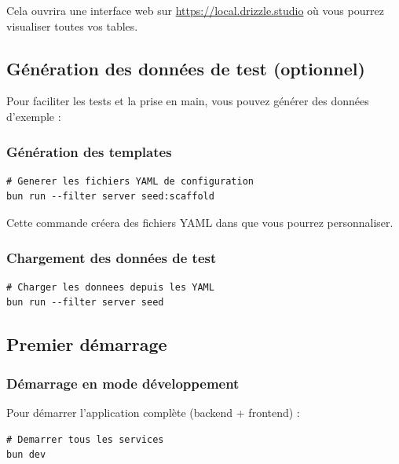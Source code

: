 Cela ouvrira une interface web sur \url{https://local.drizzle.studio} où vous pourrez visualiser toutes vos tables.

\subsection{Génération des données de test (optionnel)}

Pour faciliter les tests et la prise en main, vous pouvez générer des données d'exemple :

\subsubsection{Génération des templates}

\begin{lstlisting}[language={}, frame=single]
# Generer les fichiers YAML de configuration
bun run --filter server seed:scaffold
\end{lstlisting}

Cette commande créera des fichiers YAML dans  que vous pourrez personnaliser.

\subsubsection{Chargement des données de test}

\begin{lstlisting}[language={}, frame=single]
# Charger les donnees depuis les YAML
bun run --filter server seed
\end{lstlisting}


\subsection{Premier démarrage}

\subsubsection{Démarrage en mode développement}

Pour démarrer l'application complète (backend + frontend) :

\begin{lstlisting}[language={}, frame=single]
# Demarrer tous les services
bun dev
\end{lstlisting}


